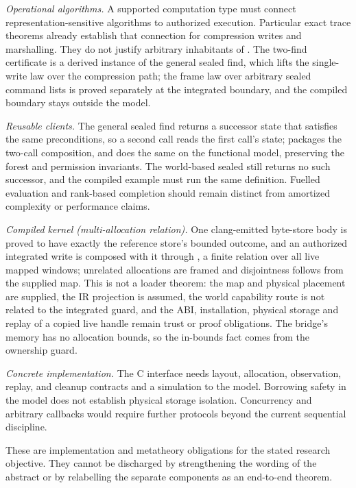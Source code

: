 \documentclass[a4paper,UKenglish,cleveref]{lipics-v2021}
\begin{document}
\emph{Operational algorithms.} A supported computation type must connect
representation-sensitive algorithms to authorized execution. Particular exact
trace theorems already establish that connection for compression writes and
marshalling. They do not justify arbitrary inhabitants of . The
two-find certificate is a derived instance of the general sealed find, which
lifts the single-write law over the compression path; the frame law over
arbitrary sealed command lists is proved separately at the integrated boundary,
and the compiled boundary stays outside the model.

\emph{Reusable clients.} The general sealed find returns a successor state that
satisfies the same preconditions, so a second call reads the first call's state;
 packages the two-call composition, and
 does the same on the functional model, preserving the
forest and permission invariants. The world-based sealed  still
returns no such successor, and the compiled example must run the same definition.
Fuelled evaluation and rank-based completion should remain distinct from
amortized complexity or performance claims.

\emph{Compiled kernel (multi-allocation relation).} One clang-emitted byte-store
body is proved to have exactly the reference store's bounded outcome, and an
authorized integrated write is composed with it through , a
finite relation over all live mapped windows; unrelated allocations are framed
and disjointness follows from the supplied map. This is not a loader theorem:
the map and physical placement are supplied, the IR projection is assumed, the
world capability route is not related to the integrated guard, and the ABI,
installation, physical storage and replay of a copied live handle remain trust
or proof obligations. The bridge's memory has no
allocation bounds, so the in-bounds fact comes from the ownership guard.

\emph{Concrete implementation.} The C interface needs layout, allocation,
observation, replay, and cleanup contracts and a simulation to the model.
Borrowing safety in the model does not establish physical storage isolation.
Concurrency and arbitrary callbacks would require further protocols beyond the
current sequential discipline.

These are implementation and metatheory obligations for the stated research
objective. They cannot be discharged by strengthening the wording of the
abstract or by relabelling the separate components as an end-to-end theorem.
\end{document}
